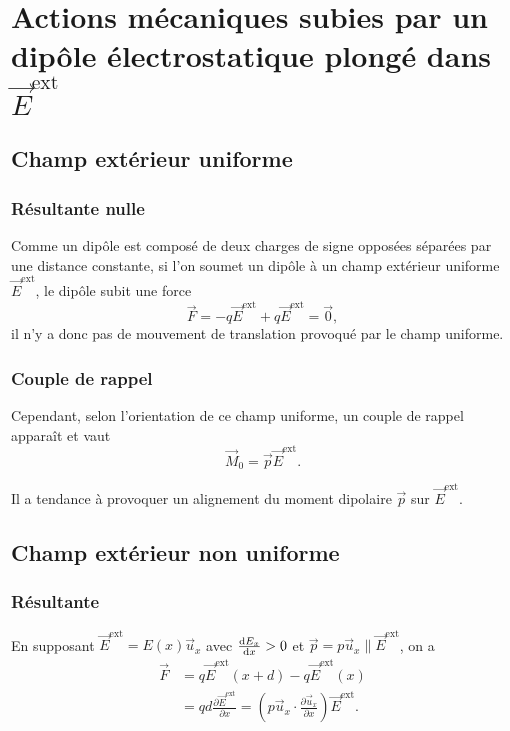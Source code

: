 \section{Actions mécaniques subies par un dipôle électrostatique plongé dans \texorpdfstring{$\vec{E}^{\text{ext}}$}{E}}

\subsection{Champ extérieur uniforme}
\subsubsection{Résultante nulle}

Comme un dipôle est composé de deux charges de signe opposées séparées par une distance constante, si l'on soumet un dipôle à un champ extérieur uniforme $\vec{E}^{\mathrm{ext}}$, le dipôle subit une force 
\begin{equation}
    \vec{F}=-q\vec{E}^{\mathrm{ext}}+q\vec{E}^{\mathrm{ext}}=\vec{0},
\end{equation}
il n'y a donc pas de mouvement de translation provoqué par le champ uniforme.

\subsubsection{Couple de rappel}

Cependant, selon l'orientation de ce champ uniforme, un couple de rappel apparaît et vaut
\begin{equation}
    \boxed{
        \vec{M}_{0}=\vec{p}\vec{E}^{\mathrm{ext}}.
    }
\end{equation}

Il a tendance à provoquer un alignement du moment dipolaire $\vec{p}$ sur $\vec{E}^{\mathrm{ext}}$.

\subsection{Champ extérieur non uniforme}
\subsubsection{Résultante}

En supposant $\vec{E}^{\mathrm{ext}}=E(x)\vec{u}_x$ avec $\frac{\mathrm{d} E_x}{\mathrm{d} x}>0$ et $\vec{p}=p\vec{u}_x\parallel\vec{E}^{\mathrm{ext}}$, on a 
\begin{align}
    \vec{F}
    &=
    q\vec{E}^{\mathrm{ext}}(x+d)-q\vec{E}^{\mathrm{ext}}(x)\\
    &=
    qd\frac{\partial \vec{E}^{\mathrm{ext}}}{\partial x}
    = \left(
        p\vec{u}_x\cdot\frac{\partial \vec{u}_x}{\partial x}
    \right)\vec{E}^{\mathrm{ext}}.
\end{align}

